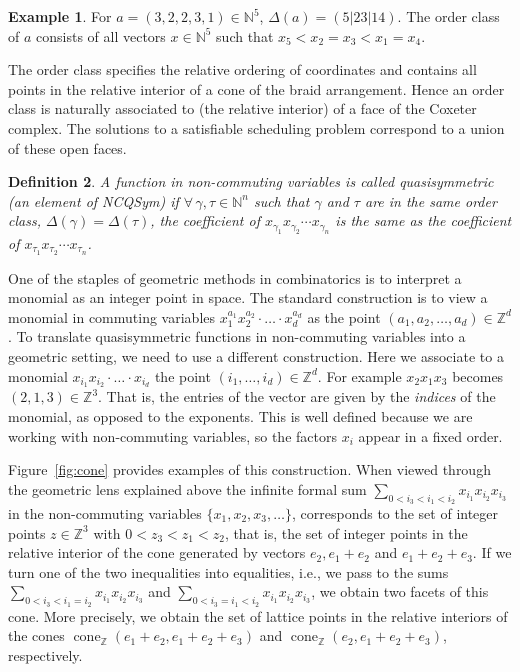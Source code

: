 \documentclass[12pt,reqno]{amsart}
\newtheorem{definition}{Definition}
\numberwithin{definition}{section}
\theoremstyle{definition}
\newtheorem{example}[definition]{Example}
\newcommand{\ZZ}{\mathbb{Z}}
\newcommand{\cone}{\operatorname{cone}}
\begin{document}
\begin{example}
For $a = (3,2,2,3,1) \in \mathbb{N}^5$, $\Delta(a) =
(5|23|14)$.  The order class of $a$ consists of all vectors $x
\in \mathbb{N}^5$ such that $x_5 < x_2 = x_3 < x_1 = x_4$. 
\end{example}


The order class specifies the relative ordering of coordinates and contains all points in the relative interior of a cone
of the braid arrangement.  Hence an order class is naturally associated to (the relative interior) of a face of
the Coxeter complex.  
The solutions to a satisfiable scheduling problem correspond to a union of these open faces.   


\begin{definition}
A function in non-commuting variables is called quasisymmetric (an element of NCQSym) if
$\forall \, \gamma, \tau \in \mathbb{N}^n$ such that $\gamma$ and $\tau$
are in the same order class, $\Delta(\gamma) =
\Delta(\tau)$, the coefficient of $x_{\gamma_1}x_{\gamma_2} \cdots
x_{\gamma_n}$ is the same as the coefficient of $x_{\tau_1}x_{\tau_2} \cdots x_{\tau_n}$.
\end{definition}
 One of the staples of geometric methods in combinatorics is to
 interpret a monomial as an integer point in space. The standard
 construction is to view a monomial in commuting variables
 $x_1^{a_1}x_2^{a_2}\cdot\ldots\cdot x_d^{a_d}$ as the point
 $(a_1,a_2,\ldots,a_d)\in\ZZ^d$. To translate quasisymmetric functions
 in non-commuting variables into a geometric setting, we need to use a
 different construction. Here we associate to a monomial
 $x_{i_1} x_{i_2} \cdot \ldots \cdot x_{i_d}$ the point
 $(i_1,\ldots,i_d)\in \ZZ^d$. For example $x_2x_1x_3$ becomes
 $(2,1,3)\in\ZZ^3$. That is, the entries of the vector are given by
 the \emph{indices} of the monomial, as opposed to the exponents. This
 is well defined because we are working with non-commuting variables, so
  the factors $x_i$ appear in a fixed order.

Figure~\ref{fig:cone} provides examples of this construction.  When viewed
through the geometric lens explained above the infinite formal sum
$\sum_{0<i_3<i_1<i_2} x_{i_1}x_{i_2}x_{i_3}$ in the non-commuting
variables $\{x_1,x_2,x_3,\ldots\}$, corresponds to the set of integer
points $z\in\ZZ^3$ with $0<z_3<z_1<z_2$, that is, the set of integer
points in the relative interior of the cone generated by vectors
$e_2,e_1+e_2$ and $e_1+e_2+e_3$. If we turn one of the two
inequalities into equalities, i.e., we pass to the sums
$\sum_{0<i_3<i_1 = i_2} x_{i_1}x_{i_2}x_{i_3}$ and
$\sum_{0<i_3=i_1<i_2} x_{i_1}x_{i_2}x_{i_3}$, we obtain two facets of
this cone. More precisely, we obtain the set of lattice points in the
relative interiors of the cones $\cone_\ZZ(e_1+e_2,e_1+e_2+e_3)$ and
$\cone_\ZZ(e_2,e_1+e_2+e_3)$, respectively.
\end{document}
